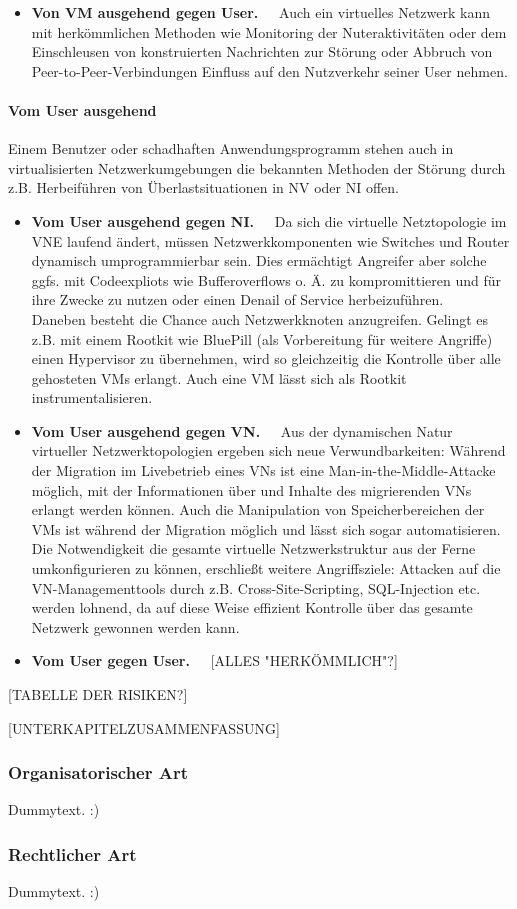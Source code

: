 \begin{itemize}
\item \textbf{Von VM ausgehend gegen User.~~}
Auch ein virtuelles Netzwerk kann mit herkömmlichen Methoden wie Monitoring der Nuteraktivitäten oder dem Einschleusen von konstruierten Nachrichten zur Störung oder Abbruch von Peer-to-Peer-Verbindungen Einfluss auf den Nutzverkehr seiner User nehmen.
\end{itemize}



\paragraph{Vom User ausgehend}
\label{parag:vonUser}
Einem Benutzer oder schadhaften Anwendungsprogramm stehen auch in virtualisierten Netzwerkumgebungen die bekannten Methoden der Störung durch z.B. Herbeiführen von Überlastsituationen in NV oder NI offen.

\begin{itemize}
	\item \textbf{Vom User ausgehend gegen NI.~~}
	Da sich die virtuelle Netztopologie im VNE laufend ändert, müssen Netzwerkkomponenten wie Switches und Router dynamisch umprogrammierbar sein. Dies ermächtigt Angreifer aber solche ggfs. mit Codeexpliots wie Bufferoverflows o. Ä. zu kompromittieren und für ihre Zwecke zu nutzen oder einen Denail of Service herbeizuführen.\\
	Daneben besteht die Chance auch Netzwerkknoten anzugreifen. Gelingt es z.B. mit einem Rootkit wie BluePill \cite{rutkowska2008bluepilling} (als Vorbereitung für weitere Angriffe) einen Hypervisor zu übernehmen, wird so gleichzeitig die Kontrolle über alle gehosteten VMs erlangt. Auch eine VM lässt sich als Rootkit instrumentalisieren.\cite{wu2010network}
	\item \textbf{Vom User ausgehend gegen VN.~~}
	Aus der dynamischen Natur virtueller Netzwerktopologien ergeben sich neue Verwundbarkeiten: Während der Migration im Livebetrieb eines VNs ist eine Man-in-the-Middle-Attacke möglich, mit der Informationen über und Inhalte des migrierenden VNs erlangt werden können. \cite{natarajansecurity} Auch die Manipulation von Speicherbereichen der VMs ist während der Migration möglich und lässt sich sogar automatisieren.\cite{oberheide2008empirical}\\
	Die Notwendigkeit die gesamte virtuelle Netzwerkstruktur aus der Ferne umkonfigurieren zu können, erschließt weitere Angriffsziele: Attacken auf die VN-Managementtools durch z.B. Cross-Site-Scripting, SQL-Injection etc. werden lohnend, da auf diese Weise effizient Kontrolle über das gesamte Netzwerk gewonnen werden kann.	
	\item \textbf{Vom User gegen User.~~}
	[ALLES "HERKÖMMLICH"?]
\end{itemize}

[TABELLE DER RISIKEN?]



[UNTERKAPITELZUSAMMENFASSUNG]


\subsubsection{Organisatorischer Art}
\label{subsubsec:gefahren_virt_organisatorisch}
Dummytext. :)

\subsubsection{Rechtlicher Art}
\label{subsubsec:gefahren_virt_rechtlich}
Dummytext. :)
